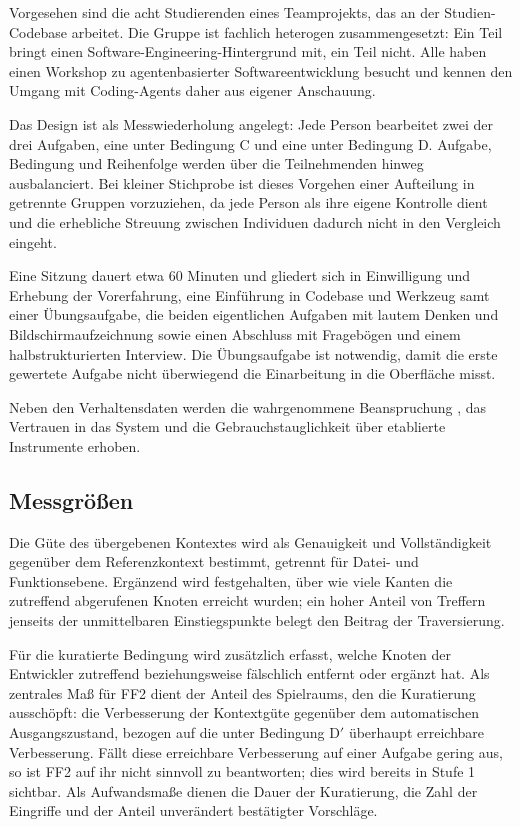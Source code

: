 Vorgesehen sind die acht Studierenden eines Teamprojekts, das an der Studien-Codebase arbeitet. Die Gruppe ist fachlich heterogen zusammengesetzt: Ein Teil bringt einen Software-Engineering-Hintergrund mit, ein Teil nicht. Alle haben einen Workshop zu agentenbasierter Softwareentwicklung besucht und kennen den Umgang mit Coding-Agents daher aus eigener Anschauung.

Das Design ist als Messwiederholung angelegt: Jede Person bearbeitet zwei der drei Aufgaben, eine unter Bedingung C und eine unter Bedingung D. Aufgabe, Bedingung und Reihenfolge werden über die Teilnehmenden hinweg ausbalanciert. Bei kleiner Stichprobe ist dieses Vorgehen einer Aufteilung in getrennte Gruppen vorzuziehen, da jede Person als ihre eigene Kontrolle dient und die erhebliche Streuung zwischen Individuen dadurch nicht in den Vergleich eingeht.

Eine Sitzung dauert etwa 60 Minuten und gliedert sich in Einwilligung und Erhebung der Vorerfahrung, eine Einführung in Codebase und Werkzeug samt einer Übungsaufgabe, die beiden eigentlichen Aufgaben mit lautem Denken und Bildschirmaufzeichnung sowie einen Abschluss mit Fragebögen und einem halbstrukturierten Interview. Die Übungsaufgabe ist notwendig, damit die erste gewertete Aufgabe nicht überwiegend die Einarbeitung in die Oberfläche misst.

Neben den Verhaltensdaten werden die wahrgenommene Beanspruchung \parencite{hart1988tlx}, das Vertrauen in das System \parencite{jian2000trust} und die Gebrauchstauglichkeit \parencite{brooke1996sus} über etablierte Instrumente erhoben.

\subsection{Messgrößen}

Die Güte des übergebenen Kontextes wird als Genauigkeit und Vollständigkeit gegenüber dem Referenzkontext bestimmt, getrennt für Datei- und Funktionsebene. Ergänzend wird festgehalten, über wie viele Kanten die zutreffend abgerufenen Knoten erreicht wurden; ein hoher Anteil von Treffern jenseits der unmittelbaren Einstiegspunkte belegt den Beitrag der Traversierung.

Für die kuratierte Bedingung wird zusätzlich erfasst, welche Knoten der Entwickler zutreffend beziehungsweise fälschlich entfernt oder ergänzt hat. Als zentrales Maß für FF2 dient der Anteil des Spielraums, den die Kuratierung ausschöpft: die Verbesserung der Kontextgüte gegenüber dem automatischen Ausgangszustand, bezogen auf die unter Bedingung D$'$ überhaupt erreichbare Verbesserung. Fällt diese erreichbare Verbesserung auf einer Aufgabe gering aus, so ist FF2 auf ihr nicht sinnvoll zu beantworten; dies wird bereits in Stufe 1 sichtbar. Als Aufwandsmaße dienen die Dauer der Kuratierung, die Zahl der Eingriffe und der Anteil unverändert bestätigter Vorschläge.

